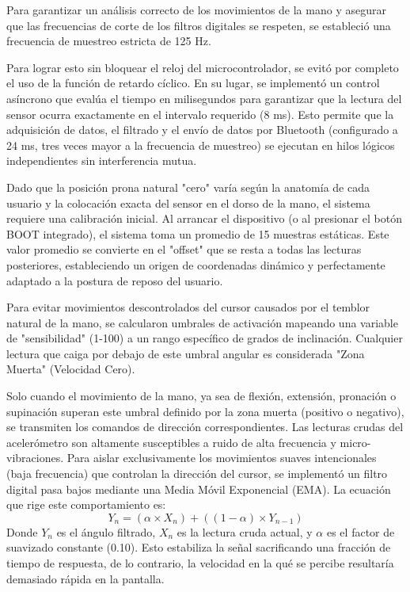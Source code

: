 \documentclass[conference]{IEEEtran}
\begin{document}
Para garantizar un análisis correcto de los movimientos de la mano y asegurar que las frecuencias de corte de los filtros digitales se respeten, se estableció una frecuencia de muestreo estricta de 125 Hz.

Para lograr esto sin bloquear el reloj del microcontrolador, se evitó por completo el uso de la función de retardo cíclico. En su lugar, se implementó un control asíncrono que evalúa el tiempo en milisegundos para garantizar que la lectura del sensor ocurra exactamente en el intervalo requerido (8 ms). Esto permite que la adquisición de datos, el filtrado y el envío de datos por Bluetooth (configurado a 24 ms, tres veces mayor a la frecuencia de muestreo) se ejecutan en hilos lógicos independientes sin interferencia mutua.

Dado que la posición prona natural "cero" varía según la anatomía de cada usuario y la colocación exacta del sensor en el dorso de la mano, el sistema requiere una calibración inicial. Al arrancar el dispositivo (o al presionar el botón BOOT integrado), el sistema toma un promedio de 15 muestras estáticas. Este valor promedio se convierte en el "offset" que se resta a todas las lecturas posteriores, estableciendo un origen de coordenadas dinámico y perfectamente adaptado a la postura de reposo del usuario.

Para evitar movimientos descontrolados del cursor causados por el temblor natural de la mano, se calcularon umbrales de activación mapeando una variable de "sensibilidad" (1-100) a un rango específico de grados de inclinación. Cualquier lectura que caiga por debajo de este umbral angular es considerada "Zona Muerta" (Velocidad Cero). 

Solo cuando el movimiento de la mano, ya sea de flexión, extensión, pronación o supinación superan este umbral definido por la zona muerta (positivo o negativo), se transmiten los comandos de dirección correspondientes. Las lecturas crudas del acelerómetro son altamente susceptibles a ruido de alta frecuencia y micro-vibraciones. Para aislar exclusivamente los movimientos suaves intencionales (baja frecuencia) que controlan la dirección del cursor, se implementó un filtro digital pasa bajos mediante una Media Móvil Exponencial (EMA). La ecuación que rige este comportamiento es:$$Y_n = (\alpha \times X_n) + ((1 - \alpha) \times Y_{n-1})$$Donde $Y_n$ es el ángulo filtrado, $X_n$ es la lectura cruda actual, y $\alpha$ es el factor de suavizado constante (0.10). Esto estabiliza la señal sacrificando una fracción de tiempo de respuesta, de lo contrario, la velocidad en la qué se percibe resultaría demasiado rápida en la pantalla. 
\end{document}
